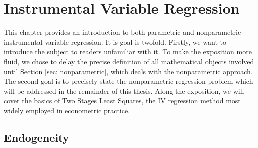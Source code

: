 \chapter{Instrumental Variable Regression}

This chapter provides an introduction to both parametric and nonparametric instrumental variable regression.
It is goal is twofold.
Firstly, we want to introduce the subject to readers unfamiliar with it.
To make the exposition more fluid, we chose to delay the precise definition of all mathematical objects involved until Section \ref{sec: nonparametric}, which deals with the nonparametric approach.
The second goal is to precisely state the nonparametric regression problem which will be addressed in the remainder of this thesis.
Along the exposition, we will cover the basics of Two Stages Least Squares, the IV regression method most widely employed in econometric practice.%

\section{Endogeneity}

